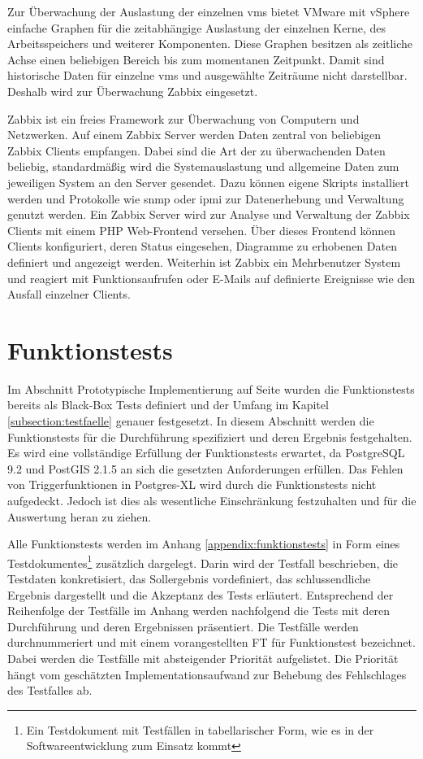 Zur Überwachung der Auslastung der einzelnen \Gls{vm}s bietet VMware mit vSphere einfache Graphen für die zeitabhängige Auslastung der einzelnen Kerne, des Arbeitsspeichers und weiterer Komponenten.
Diese Graphen besitzen als zeitliche Achse einen beliebigen Bereich bis zum momentanen Zeitpunkt.
Damit sind historische Daten für einzelne \Gls{vm}s und ausgewählte Zeiträume nicht darstellbar.
Deshalb wird zur Überwachung Zabbix eingesetzt.

Zabbix ist ein freies Framework zur Überwachung von Computern und Netzwerken.
Auf einem Zabbix Server werden Daten zentral von beliebigen Zabbix Clients empfangen.
Dabei sind die Art der zu überwachenden Daten beliebig, standardmäßig wird die Systemauslastung und allgemeine Daten zum jeweiligen System an den Server gesendet.
Dazu können eigene Skripts installiert werden und Protokolle wie \Gls{snmp} oder \Gls{ipmi} zur Datenerhebung und Verwaltung genutzt werden.
Ein Zabbix Server wird zur Analyse und Verwaltung der Zabbix Clients mit einem PHP Web-Frontend versehen.
Über dieses Frontend können Clients konfiguriert, deren Status eingesehen, Diagramme zu erhobenen Daten definiert und angezeigt werden.
Weiterhin ist Zabbix ein Mehrbenutzer System und reagiert mit Funktionsaufrufen oder E-Mails auf definierte Ereignisse wie den Ausfall einzelner Clients.


\section{Funktionstests}
Im Abschnitt Prototypische Implementierung auf Seite \pageref{grundlagen-funktionstests} wurden die Funktionstests bereits als Black-Box Tests definiert und der Umfang im Kapitel \ref{subsection:testfaelle} genauer festgesetzt.
In diesem Abschnitt werden die Funktionstests für die Durchführung spezifiziert und deren Ergebnis festgehalten.
Es wird eine vollständige Erfüllung der Funktionstests erwartet, da PostgreSQL 9.2 und PostGIS 2.1.5 an sich die gesetzten Anforderungen erfüllen.
Das Fehlen von Triggerfunktionen in Postgres-XL wird durch die Funktionstests nicht aufgedeckt.
Jedoch ist dies als wesentliche Einschränkung festzuhalten und für die Auswertung heran zu ziehen.

Alle Funktionstests werden im Anhang \ref{appendix:funktionstests} in Form eines Testdokumentes\footnote{Ein Testdokument mit Testfällen in tabellarischer Form, wie es in der Softwareentwicklung zum Einsatz kommt} zusätzlich dargelegt.
Darin wird der Testfall beschrieben, die Testdaten konkretisiert, das Sollergebnis vordefiniert, das schlussendliche Ergebnis dargestellt und die Akzeptanz des Tests erläutert.
Entsprechend der Reihenfolge der Testfälle im Anhang werden nachfolgend die Tests mit deren Durchführung und deren Ergebnissen präsentiert.
Die Testfälle werden durchnummeriert und mit einem vorangestellten FT für Funktionstest bezeichnet.
Dabei werden die Testfälle mit absteigender Priorität aufgelistet.
Die Priorität hängt vom geschätzten Implementationsaufwand zur Behebung des Fehlschlages des Testfalles ab.

